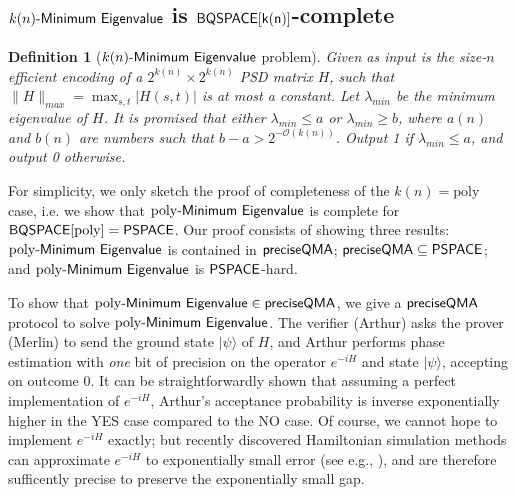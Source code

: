 \documentclass[11pt]{article}
\newtheorem{theorem}[lemma]{Theorem}
\newtheorem{definition}[lemma]{Definition}
\numberwithin{lemma}{section}
\theoremstyle{definition}
\newcommand\BQSPACE{\sf{BQSPACE}}
\newcommand\PSPACE{\sf{PSPACE}}
\newcommand\preciseQMA{{\sf{preciseQMA}}}
\newcommand{\poly}{\mathrm{poly}}
\renewcommand{\le}{\leqslant}
\renewcommand{\ge}{\geqslant}
\newcommand{\ket}[1]{|#1\rangle}
\newcommand\spechamiltonian[1]{#1\textit{\sf{-Minimum Eigenvalue}}}
\begin{document}
\subsection{$\spechamiltonian{k(n)}$ is $\BQSPACE[k(n)]$-complete}
\begin{definition}[$\spechamiltonian{k(n)}$ problem] \label{def: spechamiltonian}
Given as input is the size-$n$ efficient encoding of a $2^{k(n)} \times 2^{k(n)}$ PSD matrix $H$, such that %
$\|H\|_{max} = \max_{s,t}|H(s,t)|$ is at most a constant. Let $\lambda_{min}$ be the minimum eigenvalue of $H$. It is promised that either $\lambda_{min} \le a$ or $\lambda_{min} \ge b$, where $a(n)$ and $b(n)$ are numbers such that $b-a > 2^{-\mathcal{O}(k(n))}$. Output 1 if $\lambda_{min} \le a$, and output 0 otherwise.
\end{definition}


For simplicity, we only sketch the proof of completeness of the $k(n) = \poly$ case, i.e. we show that $\spechamiltonian{\poly}$ is complete for $\BQSPACE[\poly] = \PSPACE$. Our proof consists of showing three results: $\spechamiltonian{\poly}$ is contained in $\preciseQMA$; $\preciseQMA \subseteq \PSPACE$; and $\spechamiltonian{\poly}$ is $\PSPACE$-hard.

To show that $\spechamiltonian{\poly} \in \preciseQMA$, we give a $\preciseQMA$ protocol to solve $\spechamiltonian{\poly}$. The verifier (Arthur) asks the prover (Merlin) to send the ground state $\ket{\psi}$ of $H$, and Arthur performs phase estimation with \emph{one} bit of precision on the operator $e^{-iH}$ and state $\ket{\psi}$, accepting on outcome 0. It can be straightforwardly shown that assuming a perfect implementation of $e^{-iH}$, Arthur's acceptance probability is inverse exponentially higher in the YES case compared to the NO case. Of course, we cannot hope to implement $e^{-iH}$ exactly; but recently discovered Hamiltonian simulation methods can approximate $e^{-iH}$ to exponentially small error (see e.g., \cite{berry14,berry15}), and are therefore sufficently precise to preserve the exponentially small gap.
\end{document}
